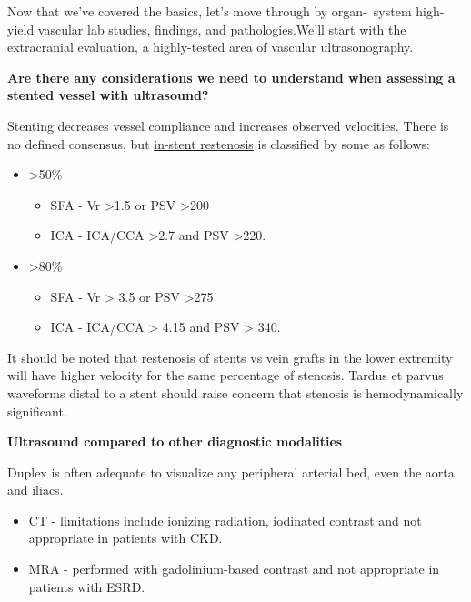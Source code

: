 \documentclass[
]{book}
\begin{document}
Now that we've covered the basics, let's move through by organ-~system
high-yield vascular lab studies, findings, and pathologies.We'll start
with the extracranial evaluation, a highly-tested area of vascular
ultrasonography.

\textbf{Are there any considerations we need to understand when assessing a
stented vessel with ultrasound?}

Stenting decreases vessel compliance and increases observed velocities.
There is no defined consensus, but \uline{in-stent restenosis} is
classified by some as follows:

\begin{itemize}
\item
  \textgreater50\%

  \begin{itemize}
  \item
    SFA - Vr \textgreater1.5 or PSV \textgreater200 \citep{baril2009, kawarada2013}
  \item
    ICA - ICA/CCA \textgreater2.7 and PSV \textgreater220.\citep{lal2008}
  \end{itemize}
\item
  \textgreater80\%

  \begin{itemize}
  \item
    SFA - Vr \textgreater{} 3.5 or PSV \textgreater275 \citep{baril2009, kawarada2013}
  \item
    ICA - ICA/CCA \textgreater{} 4.15 and PSV \textgreater{} 340.\citep{lal2008}
  \end{itemize}
\end{itemize}

It should be noted that restenosis of stents vs vein grafts in the lower
extremity will have higher velocity for the same percentage of stenosis.
Tardus et parvus waveforms distal to a stent should raise concern that
stenosis is hemodynamically significant.\citep{baril2009, kawarada2013}

\textbf{Ultrasound compared to other diagnostic modalities}

Duplex is often adequate to visualize any peripheral arterial bed, even
the aorta and iliacs.\citep{muelaméndez2018}

\begin{itemize}
\item
  CT - limitations include ionizing radiation, iodinated contrast and
  not appropriate in patients with CKD.
\item
  MRA - performed with gadolinium-based contrast and not appropriate
  in patients with ESRD.
\end{itemize}
\end{document}
